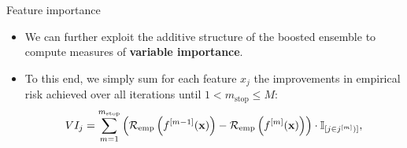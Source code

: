 \documentclass[11pt,compress,t,notes=noshow, xcolor=table]{beamer}
\begin{document}
\begin{vbframe}{Feature importance}
\begin{itemize}
  \item We can further exploit the additive structure of the boosted ensemble to
  compute measures of \textbf{variable importance}.
  \item To this end, we simply sum for each feature $x_j$ the improvements in
  empirical risk achieved over all iterations until
  $1 < m_{\text{stop}} \leq M$:
    $$VI_j = \sum_{m = 1}^{m_{\text{stop}}} \left( \mathcal{R}_{\text{emp}} \left(
    f^{[m-1]}(\mathbf{x}) \right) - \mathcal{R}_{\text{emp}} \left(f^{[m]}(\mathbf{x})
    \right) \right) \cdot \mathbb{I}_{[j \in j^{[m]})]},$$
\end{itemize}

\end{vbframe}

%
%
%
%
%



\end{document}
